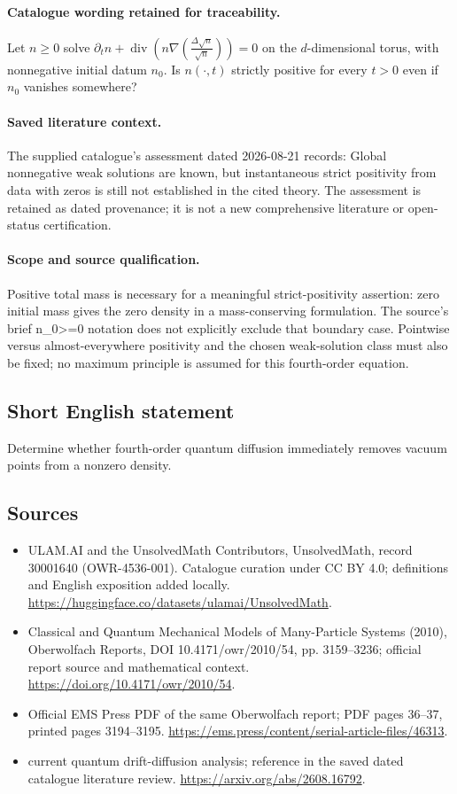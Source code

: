\documentclass[11pt]{article}
\begin{document}
\paragraph{Catalogue wording retained for traceability.}
Let $n\geq0$ solve $\partial_t n+\operatorname{div}\!\left(n\nabla\left(\frac{\Delta\sqrt n}{\sqrt n}\right)\right)=0$ on the $d$-dimensional torus, with nonnegative initial datum $n_0$. Is $n(\cdot,t)$ strictly positive for every $t>0$ even if $n_0$ vanishes somewhere?

\paragraph{Saved literature context.} The supplied catalogue's assessment dated 2026-08-21 records: Global nonnegative weak solutions are known, but instantaneous strict positivity from data with zeros is still not established in the cited theory. The assessment is retained as dated provenance; it is not a new comprehensive literature or open-status certification.
\paragraph{Scope and source qualification.}Positive total mass is necessary for a meaningful strict-positivity assertion: zero initial mass gives the zero density in a mass-conserving formulation. The source's brief n_0>=0 notation does not explicitly exclude that boundary case. Pointwise versus almost-everywhere positivity and the chosen weak-solution class must also be fixed; no maximum principle is assumed for this fourth-order equation.
\subsection{Short English statement}
Determine whether fourth-order quantum diffusion immediately removes vacuum points from a nonzero density.
\subsection{Sources}
\begin{itemize}
\item[\hypertarget{source:30001640:1}{S1}] ULAM.AI and the UnsolvedMath Contributors, UnsolvedMath, record 30001640 (OWR-4536-001). Catalogue curation under CC BY 4.0; definitions and English exposition added locally.
\url{https://huggingface.co/datasets/ulamai/UnsolvedMath}.
\item[\hypertarget{source:30001640:2}{S2}] Classical and Quantum Mechanical Models of Many-Particle Systems (2010), Oberwolfach Reports, DOI 10.4171/owr/2010/54, pp. 3159--3236; official report source and mathematical context.
\url{https://doi.org/10.4171/owr/2010/54}.
\item[\hypertarget{source:30001640:3}{S3}] Official EMS Press PDF of the same Oberwolfach report; PDF pages 36--37, printed pages 3194--3195.
\url{https://ems.press/content/serial-article-files/46313}.
\item[\hypertarget{source:30001640:4}{S4}] current quantum drift-diffusion analysis; reference in the saved dated catalogue literature review.
\url{https://arxiv.org/abs/2608.16792}.
\end{itemize}
\label{end:30001640}
\end{document}
